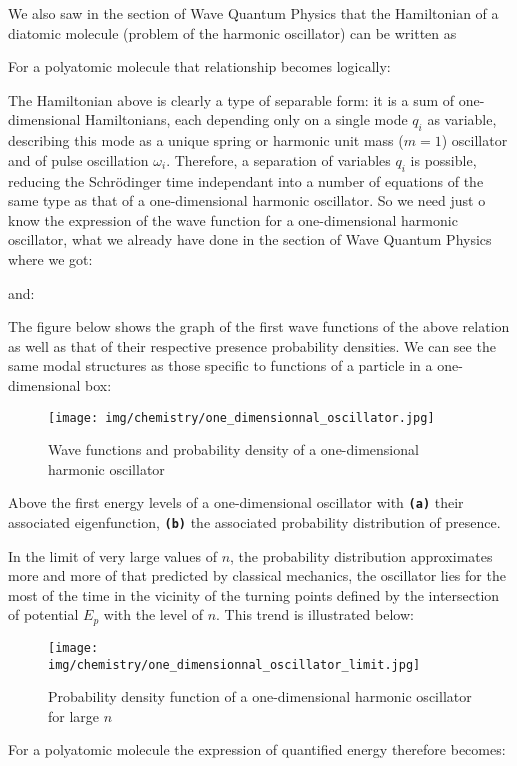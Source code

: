 	We also saw in the section of Wave Quantum Physics that the Hamiltonian of a diatomic molecule (problem of the harmonic oscillator) can be written as
	
	For a polyatomic molecule that relationship becomes logically:
	
	The Hamiltonian above is clearly a type of separable form: it is a sum of one-dimensional Hamiltonians, each depending only on a single mode $q_i$ as variable, describing this mode as a unique spring or harmonic unit mass ($m=1$) oscillator and of pulse oscillation $\omega_i$. Therefore, a separation of variables $q_i$ is possible, reducing the Schrödinger time independant into a number of equations of the same type as that of a one-dimensional harmonic oscillator. So we need just o know the expression of the wave function for a one-dimensional harmonic oscillator, what we already have done in the section of Wave Quantum Physics where we got:
	
	and:
	
	The figure below shows the graph of the first wave functions of the above relation as well as that of their respective presence probability densities. We can see the same modal structures as those specific to functions of a particle in a one-dimensional box:
	\begin{figure}[H]
		\begin{center}
		\texttt{[image: img/chemistry/one\_dimensionnal\_oscillator.jpg]}
		\end{center}	
		\caption{Wave functions and probability density of a one-dimensional harmonic oscillator}
	\end{figure}
	Above the first energy levels of a one-dimensional oscillator with \texttt{\textbf{(a)}} their associated eigenfunction, \texttt{\textbf{(b)}} the  associated probability distribution of presence.
	
	In the limit of very large values of $n$, the probability distribution approximates more and more of that predicted by classical mechanics, the oscillator lies for the most of the time in the vicinity of the turning points defined by the intersection of potential $E_{p}$ with the level of $n$. This trend is illustrated below:
	\begin{figure}[H]
		\begin{center}
		\texttt{[image: img/chemistry/one\_dimensionnal\_oscillator\_limit.jpg]}
		\end{center}	
		\caption{Probability density function of a one-dimensional harmonic oscillator for large $n$}
	\end{figure}
	For a polyatomic molecule the expression of quantified energy therefore becomes:
	
